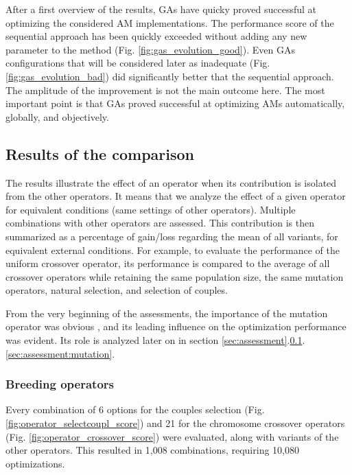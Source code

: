 \documentclass{ametsoc}
\begin{document}
After a first overview of the results, GAs have quicky proved successful at optimizing the considered AM implementations. The performance score of the sequential approach has been quickly exceeded without adding any new parameter to the method (Fig. \ref{fig:gas_evolution_good}). Even GAs configurations that will be considered later as inadequate (Fig. \ref{fig:gas_evolution_bad}) did significantly better that the sequential approach. The amplitude of the improvement is not the main outcome here. The most important point is that GAs proved successful at optimizing AMs automatically, globally, and objectively.


\subsection{Results of the comparison}
\label{sec:assessment:results}

The results illustrate the effect of an operator when its contribution is isolated from the other operators. It means that we analyze the effect of a given operator for equivalent conditions (same settings of other operators). Multiple combinations with other operators are assessed. This contribution is then summarized as a percentage of gain/loss regarding the mean of all variants, for equivalent external conditions. For example, to evaluate the performance of the uniform crossover operator, its performance is compared to the average of all crossover operators while retaining the same population size, the same mutation operators, natural selection, and selection of couples.

From the very beginning of the assessments, the importance of the mutation operator was obvious \cite[see][for the details]{Horton2012a}, and its leading influence on the optimization performance was evident. Its role is analyzed later on in section \ref{sec:assessment}.\ref{sec:assessment:results}.\ref{sec:assessment:mutation}.

\subsubsection{Breeding operators}

Every combination of 6 options for the couples selection (Fig. \ref{fig:operator_selectcoupl_score}) and 21 for the chromosome crossover operators (Fig. \ref{fig:operator_crossover_score}) were evaluated, along with variants of the other operators. This resulted in 1,008 combinations, requiring 10,080 optimizations.
\end{document}
